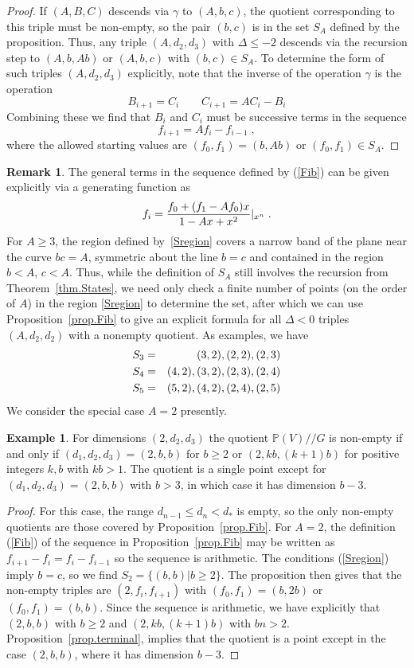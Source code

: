\documentclass[12pt]{article}
\theoremstyle{definition}
\newtheorem{remark}[theorem]{Remark}
\newtheorem{example}[theorem]{Example}
\newcommand{\be}{\begin{equation}}
\newcommand{\ee}{\end{equation}}
\newcommand{\bea}{\begin{eqnarray}}
\newcommand{\eea}{\end{eqnarray}}
\newcommand{\GITquot}{/\!/}
\begin{document}
\begin{proof}
If $(A,B,C)$ descends via $\gamma$ to $(A,b,c)$, the quotient corresponding to this triple must be non-empty, so the pair $(b,c)$ is in the set $S_A$ defined by the proposition. Thus, any triple $(A,d_2,d_3)$ with $\Delta \le -2$ descends via the recursion step to $(A,b,Ab)$ or $(A,b,c)$ with $(b,c) \in S_A$. To determine the form of such triples $(A,d_2,d_3)$ explicitly, note that the inverse of the operation $\gamma$ is the operation
\be
B_{i+1} = C_i \qquad C_{i+1} = A C_i - B_i
\ee
Combining these we find that $B_i$ and $C_i$ must be successive terms in the sequence
\be
f_{i+1} = A f_i - f_{i-1} \; ,
\ee
where the allowed starting values are $(f_0,f_1) = (b,Ab)$ or $(f_0, f_1) \in S_A$.
\end{proof}
\begin{remark}
The general terms in the sequence defined by (\ref{Fib}) can be given explicitly via a generating function as
\be
f_i = {f_0 + (f_1 - A f_0) x \over 1 - Ax + x^2}|_{x^n} \; .
\ee
For $A \ge 3$, the region defined by~\eqref{Sregion} covers a narrow band of the plane near the curve $bc=A$, symmetric about the line $b=c$ and contained in the region $b < A$, $c < A$. Thus, while the definition of $S_A$ still involves the recursion from Theorem~\ref{thm.States}, we need only check a finite number of points (on the order of $A$) in the region \eqref{Sregion} to determine the set, after which we can use Proposition~\ref{prop.Fib} to give an explicit formula for all $\Delta < 0$ triples $(A,d_2,d_2)$ with a nonempty quotient. As examples, we have
\bea
S_3 &=& {(3,2),(2,2),(2,3)} \cr
S_4 &=& {(4,2),(3,2),(2,3),(2,4)} \cr
S_5 &=& {(5,2),(4,2),(2,4),(2,5)}
\eea
We consider the special case $A=2$ presently.
\end{remark}
\begin{example}
For dimensions $(2,d_2,d_3)$ the quotient $\mathbb P(V) \GITquot  G$ is non-empty if and only if $(d_1,d_2,d_3) = (2,b,b)$ for $b \ge 2$ or $(2,kb,(k+1)b)$ for positive integers $k,b$ with $kb > 1$. The quotient is a single point except for $(d_1,d_2,d_3) = (2,b,b)$ with $b>3$, in which case it has dimension $b-3$.
\end{example}
\begin{proof}
For this case, the range $d_{n-1} \le d_n < d_*$ is empty, so the only non-empty quotients are those covered by Proposition~\ref{prop.Fib}. For $A=2$, the definition (\ref{Fib}) of the sequence in Proposition~\ref{prop.Fib} may be written as $f_{i+1} - f_{i} = f_i - f_{i-1}$ so the sequence is arithmetic. The conditions (\ref{Sregion}) imply $b=c$, so we find $S_2 = \{(b,b)|b \ge 2\}$. The proposition then gives that the non-empty triples are $(2,f_i,f_{i+1})$ with $(f_0,f_1) = (b,2b)$ or $(f_0,f_1) = (b,b)$. Since the sequence is arithmetic, we have explicitly that $(2,b,b)$ with $b \ge 2$ and $(2,kb,(k+1)b)$ with $bn > 2$. Proposition~\ref{prop.terminal}, implies that the quotient is a point except in the case $(2,b,b)$, where it has dimension $b-3$.
\end{proof}
\end{document}
